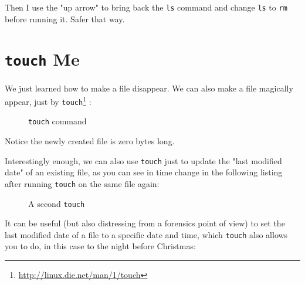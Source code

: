 \documentclass[10pt,american,]{book}
\makeatletter
\newenvironment{Shaded}{\begin{snugshade}}{\end{snugshade}}
\newcommand{\KeywordTok}[1]{\textcolor[rgb]{0.13,0.29,0.53}{\textbf{{#1}}}}
\newcommand{\NormalTok}[1]{{#1}}
\renewcommand{\href}[2]{#2\footnote{\url{#1}}}
\numberwithin{figure}{chapter}
\DeclareRobustCommand{\drcap}[1]{\begin{figure}[H]\caption{#1}\end{figure}}
\DeclareRobustCommand{\drcmd}[1]{\index{commands!#1@\texttt{#1}}}
\renewcommand{\KeywordTok}[1]{{#1}}
\renewcommand{\NormalTok}[1]{{#1}}
\makeatother
\begin{document}
Then I use the "up arrow" to bring back the \texttt{ls} command and
change \texttt{ls} to \texttt{rm} before running it. Safer that way.

\section*{\texorpdfstring{\texttt{touch} Me}{touch Me}}\label{touch-me}

We just learned how to make a file disappear. We can also make a file
magically appear, just by
\href{http://linux.die.net/man/1/touch}{\texttt{touch}}\drcmd{touch}
:

\drcap{\texttt{touch} command}

\begin{Shaded}
\end{Shaded}

Notice the newly created file is zero bytes long.

Interestingly enough, we can also use \texttt{touch} just to update the
"last modified date" of an existing file, as you can see in time change
in the following listing after running
\texttt{touch}
on the same file again:

\drcap{A second \texttt{touch}}

\begin{Shaded}
\end{Shaded}

It can be useful (but also distressing from a forensics point of view)
to set the last modified date of a file to a specific date and time,
which
\texttt{touch}
also allows you to do, in this case to the night before Christmas:
\end{document}
